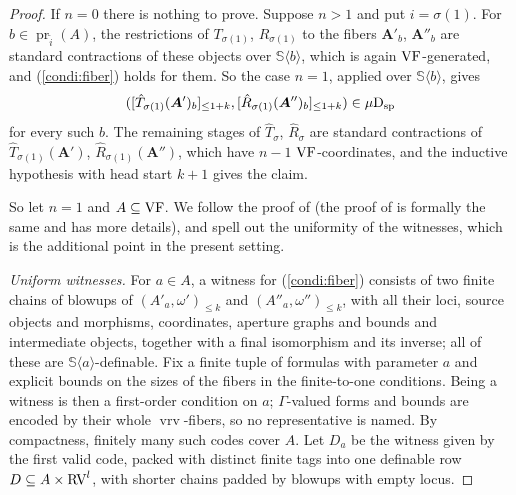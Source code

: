 \documentclass[12pt]{amsart}
\theoremstyle{plain}
\theoremstyle{definition}
\theoremstyle{remark}
\numberwithin{equation}{section}
\theoremstyle{plain}
\newcommand{\VF}{\textup{VF}}
\newcommand{\RV}{\textup{RV}}
\DeclareMathOperator{\pr}{pr}
\newcommand{\0}{\emptyset}
\newcommand{\sub}{\subseteq}
\newcommand{\la}{\langle}
\newcommand{\ra}{\rangle}
\newcommand{\dsp}{\textup{D}_{\textup{sp}}}
\newcommand{\mispdb}{\mu \dsp}
\DeclareMathOperator{\vrv}{vrv}
\begin{document}
\begin{proof}
If $n = 0$ there is nothing to prove. Suppose $n > 1$ and put $i = \sigma(1)$. For $b \in \pr_{\tilde i}(A)$, the restrictions of $T_{\sigma(1)}$, $R_{\sigma(1)}$ to the fibers $\bm A'_b$, $\bm A''_b$ are standard contractions of these objects over $\mathbb S \la b \ra$, which is again $\VF$-generated, and (\ref{condi:fiber}) holds for them. So the case $n = 1$, applied over $\mathbb S \la b \ra$, gives
\[
([\hat T_{\sigma(1)}(\bm A')_b]_{\leq 1+k}, [\hat R_{\sigma(1)}(\bm A'')_b]_{\leq 1+k}) \in \mispdb
\]
for every such $b$. The remaining stages of $\hat T_\sigma$, $\hat R_\sigma$ are standard contractions of $\hat T_{\sigma(1)}(\bm A')$, $\hat R_{\sigma(1)}(\bm A'')$, which have $n-1$ $\VF$-coordinates, and the inductive hypothesis with head start $k+1$ gives the claim.

So let $n = 1$ and $A \sub \VF$. We follow the proof of \cite[Lemma~6.14]{Yin:int:acvf} (the proof of \cite[Lemma~5.36]{Yin:tcon:I} is formally the same and has more details), and spell out the uniformity of the witnesses, which is the additional point in the present setting.

\emph{Uniform witnesses.} For $a \in A$, a witness for (\ref{condi:fiber}) consists of two finite chains of blowups of $(A'_a, \omega')_{\leq k}$ and $(A''_a, \omega'')_{\leq k}$, with all their loci, source objects and morphisms, coordinates, aperture graphs and bounds and intermediate objects, together with a final isomorphism and its inverse; all of these are $\mathbb S \la a \ra$-definable. Fix a finite tuple of formulas with parameter $a$ and explicit bounds on the sizes of the fibers in the finite-to-one conditions. Being a witness is then a first-order condition on $a$; $\Gamma$-valued forms and bounds are encoded by their whole $\vrv$-fibers, so no representative is named. By compactness, finitely many such codes cover $A$. Let $D_a$ be the witness given by the first valid code, packed with distinct finite tags into one definable row $D \sub A \times \RV^l$, with shorter chains padded by blowups with empty locus.


\end{proof}
\end{document}
